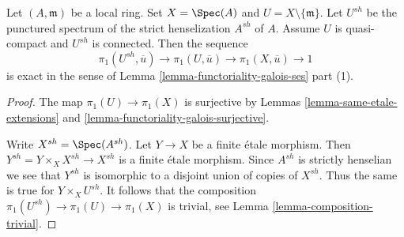 \begin{lemma}
\label{lemma-local-exact-sequence}
Let $(A, \mathfrak m)$ be a local ring. Set $X = \Spec(A)$ and
$U = X \setminus \{\mathfrak m\}$. Let $U^{sh}$ be the punctured spectrum
of the strict henselization $A^{sh}$ of $A$.
Assume $U$ is quasi-compact and $U^{sh}$ is connected. Then the sequence
$$
\pi_1(U^{sh}, \overline{u}) \to \pi_1(U, \overline{u}) \to
\pi_1(X, \overline{u}) \to 1
$$
is exact in the sense of Lemma \ref{lemma-functoriality-galois-ses} part (1).
\end{lemma}

\begin{proof}
The map $\pi_1(U) \to \pi_1(X)$ is surjective by
Lemmas \ref{lemma-same-etale-extensions} and
\ref{lemma-functoriality-galois-surjective}.

\medskip\noindent
Write $X^{sh} = \Spec(A^{sh})$. Let $Y \to X$ be a finite \'etale morphism.
Then $Y^{sh} = Y \times_X X^{sh} \to X^{sh}$ is a finite \'etale morphism.
Since $A^{sh}$ is strictly henselian we see that $Y^{sh}$ is isomorphic
to a disjoint union of copies of $X^{sh}$. Thus the same is true for
$Y \times_X U^{sh}$. It follows that the composition
$\pi_1(U^{sh}) \to \pi_1(U) \to \pi_1(X)$ is trivial, see
Lemma \ref{lemma-composition-trivial}.


\end{proof}

